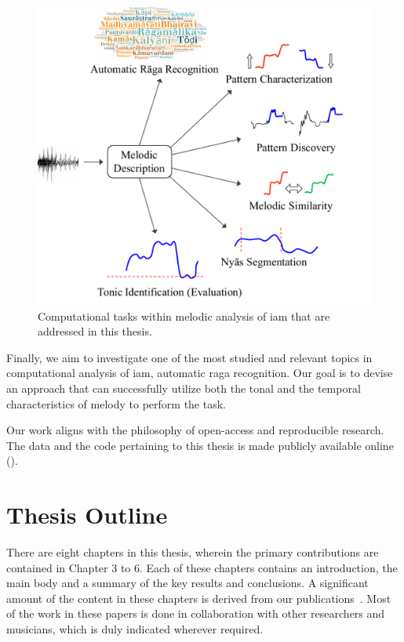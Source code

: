 \begin{figure}
	\begin{center}
		\includegraphics[width=\figSizeSeventyFive]{ch01_introduction/figures/tasks.pdf}
	\end{center}
	\caption[Computational melodic analyses addressed in this thesis]{Computational tasks within melodic analysis of \gls{iam} that are addressed in this thesis.}
	\label{fig:tasks}
\end{figure}

Finally, we aim to investigate one of the most studied and relevant topics in computational analysis of \gls{iam}, automatic \gls{raga} recognition. Our goal is to devise an approach that can successfully utilize both the tonal and the temporal characteristics of melody to perform the task. 

Our work aligns with the philosophy of open-access and reproducible research. The data and the code pertaining to this thesis is made publicly available online (). 

\section{Thesis Outline}
\label{sec:intro_thesis_outline}

There are eight chapters in this thesis, wherein the primary contributions are contained in Chapter 3 to 6. Each of these chapters contains an introduction, the main body and a summary of the key results and conclusions. A significant amount of the content in these chapters is derived from our publications~\cite{Gulati2014Tonic,gulati2014Landmark,gulati_SITIS_2014,gulati_ICASSP2015,gulati_ISMIR_2015,gulati_communities_2016,gulatiphrase_2016,gulati_tdms_2016}. Most of the work in these papers is done in collaboration with other researchers and musicians, which is duly indicated wherever required. 

